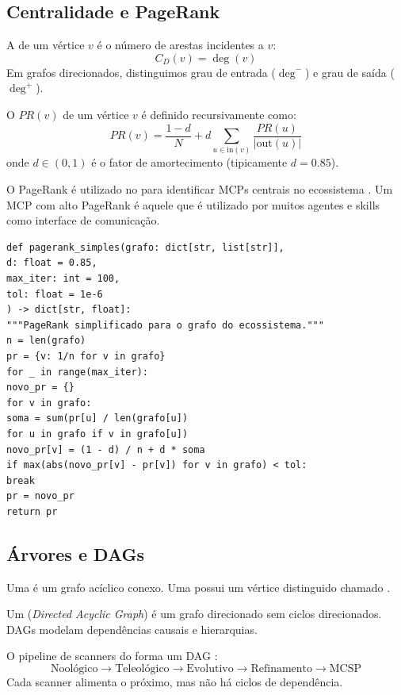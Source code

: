 \subsection{Centralidade e PageRank}
\begin{definicao}
A  de um vértice $v$ é o número de
arestas incidentes a $v$:
\[C_D(v) = \deg(v)
\]
Em grafos direcionados, distinguimos grau de entrada ($\deg^-$) e grau
de saída ($\deg^+$).
\end{definicao}
\begin{definicao}[PageRank]
O  $PR(v)$ de um vértice $v$ é definido
recursivamente como:
\[PR(v) = \frac{1-d}{N} + d \sum_{u \in \text{in}(v)}
\frac{PR(u)}{|\text{out}(u)|}
\]
onde $d \in (0,1)$ é o fator de amortecimento (tipicamente $d = 0.85$).
\end{definicao}
\begin{exemplo}
O PageRank é utilizado no \opencodeeco{} para identificar MCPs centrais
no ecossistema \cite{opencode2026scanner}. Um MCP com alto PageRank é
aquele que é utilizado por muitos agentes e skills como interface de
comunicação.
\begin{lstlisting}[style=pythonstyle]
def pagerank_simples(grafo: dict[str, list[str]],
d: float = 0.85,
max_iter: int = 100,
tol: float = 1e-6
) -> dict[str, float]:
"""PageRank simplificado para o grafo do ecossistema."""
n = len(grafo)
pr = {v: 1/n for v in grafo}
for _ in range(max_iter):
novo_pr = {}
for v in grafo:
soma = sum(pr[u] / len(grafo[u])
for u in grafo if v in grafo[u])
novo_pr[v] = (1 - d) / n + d * soma
if max(abs(novo_pr[v] - pr[v]) for v in grafo) < tol:
break
pr = novo_pr
return pr
\end{lstlisting}
\end{exemplo}
\subsection{Árvores e DAGs}
\begin{definicao}[Árvore]
Uma  é um grafo acíclico conexo. Uma  possui um vértice distinguido chamado .
\end{definicao}
\begin{definicao}[DAG]
Um  (\textit{Directed Acyclic Graph}) é um grafo
direcionado sem ciclos direcionados. DAGs modelam dependências causais
e hierarquias.
\end{definicao}
\begin{exemplo}
O pipeline de scanners do \opencodeeco{} forma um DAG
\cite{opencode2026scanner}:
\[\text{Noológico} \to \text{Teleológico} \to \text{Evolutivo} \to
\text{Refinamento} \to \text{MCSP}
\]
Cada scanner alimenta o próximo, mas não há ciclos de dependência.
\end{exemplo}
